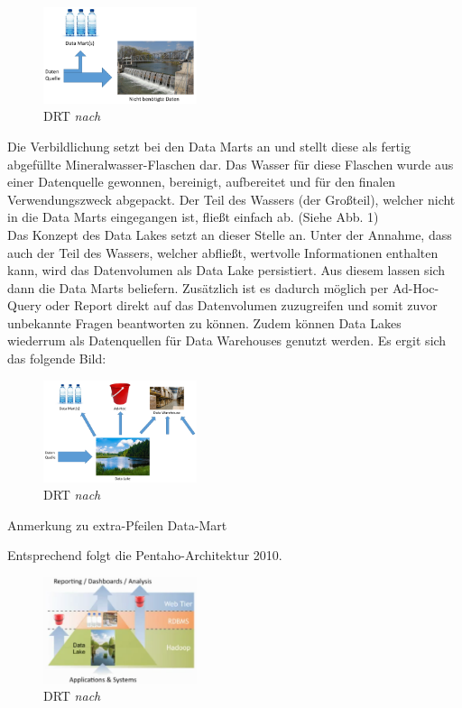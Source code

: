 \documentclass[twoside,twocolumn]{article}
\begin{document}
\begin{figure}[h]
	\centering 
	\includegraphics[width=0.4\textwidth]{img/p1} 
	\caption[DRT]{DRT \textit{nach} \cite{src6}}	
\end{figure}

Die Verbildlichung setzt bei den Data Marts an und stellt diese als fertig abgefüllte Mineralwasser-Flaschen dar. Das Wasser für diese Flaschen wurde aus einer Datenquelle gewonnen, bereinigt, aufbereitet und für den finalen Verwendungszweck abgepackt. Der Teil des Wassers (der Großteil), welcher nicht in die Data Marts eingegangen ist, fließt einfach ab. (Siehe Abb. 1)\\
Das Konzept des Data Lakes setzt an dieser Stelle an. Unter der Annahme, dass auch der Teil des Wassers, welcher abfließt, wertvolle Informationen enthalten kann, wird das Datenvolumen als Data Lake persistiert. Aus diesem lassen sich dann die Data Marts beliefern. Zusätzlich ist es dadurch möglich per Ad-Hoc-Query oder Report direkt auf das Datenvolumen zuzugreifen und somit zuvor unbekannte Fragen beantworten zu können. Zudem können Data Lakes wiederrum als Datenquellen für Data Warehouses genutzt werden. Es ergit sich das folgende Bild:

\begin{figure}[h]
	\centering 
	\includegraphics[width=0.4\textwidth]{img/p2} 
	\caption[DRT]{DRT \textit{nach} \cite{src6}}	
\end{figure}


Anmerkung zu extra-Pfeilen Data-Mart

Entsprechend folgt die Pentaho-Architektur 2010.

\begin{figure}[h]
	\centering 
	\includegraphics[width=0.4\textwidth]{img/p3} 
	\caption[DRT]{DRT \textit{nach} \cite{src6b}}	
\end{figure}
\end{document}
